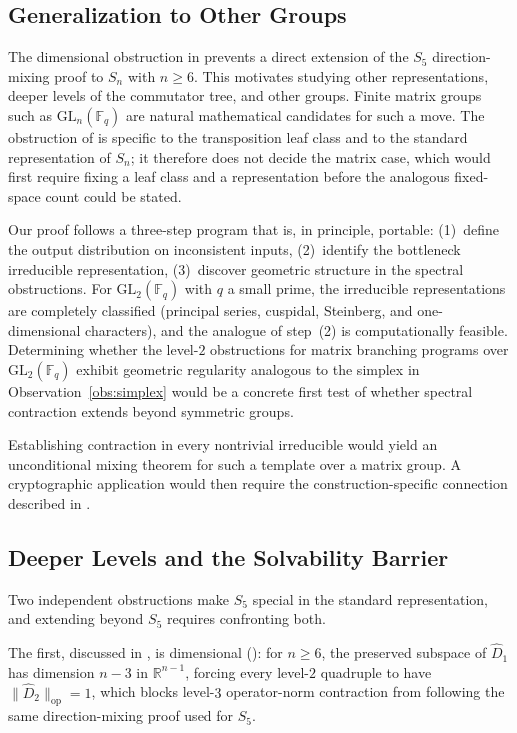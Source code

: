\documentclass[version=final]{iacrcc}
\newcommand{\norm}[1]{\lVert #1 \rVert}
\newcommand{\opn}[1]{\norm{#1}_{\mathrm{op}}}
\newcommand{\Dhat}{\widehat{D}}
\begin{document}
\subsection{Generalization to Other Groups}

The dimensional obstruction in  prevents a direct
extension of the $S_5$ direction-mixing proof to $S_n$ with $n \geq 6$.
This motivates studying other representations, deeper levels of the
commutator tree, and other groups. Finite matrix groups such as
$\mathrm{GL}_n(\mathbb{F}_q)$ are natural
mathematical candidates for such a move. The obstruction of
 is specific to the transposition leaf class and to
the standard representation of $S_n$; it therefore does not decide the matrix
case, which would first require fixing a leaf class and a representation before
the analogous fixed-space count could be stated.

Our proof follows a three-step program that is, in principle, portable:
(1)~define the output distribution on inconsistent inputs,
(2)~identify the bottleneck irreducible representation,
(3)~discover geometric structure in the spectral obstructions.
For $\mathrm{GL}_2(\mathbb{F}_q)$ with $q$ a small prime, the irreducible
representations are completely classified (principal series, cuspidal,
Steinberg, and one-dimensional characters), and the analogue of step~(2) is
computationally feasible.  Determining whether the level-$2$ obstructions
for matrix branching programs over $\mathrm{GL}_2(\mathbb{F}_q)$ exhibit
geometric regularity analogous to the simplex in Observation~\ref{obs:simplex} would
be a concrete first test of whether spectral contraction extends beyond
symmetric groups.

Establishing contraction in every nontrivial irreducible would yield an
unconditional mixing theorem for such a template over a matrix group.
A cryptographic application would then require the construction-specific
connection described in .


\subsection{Deeper Levels and the Solvability Barrier}

Two independent obstructions make $S_5$ special in the standard
representation, and extending beyond $S_5$ requires confronting both.

The first, discussed in , is dimensional
(): for $n \geq 6$, the preserved subspace of
$\Dhat_1$ has dimension $n-3$ in $\mathbb{R}^{n-1}$, forcing every
level-$2$ quadruple to have $\opn{\Dhat_2} = 1$, which blocks level-$3$
operator-norm contraction from following the same direction-mixing proof used
for $S_5$.
\end{document}

